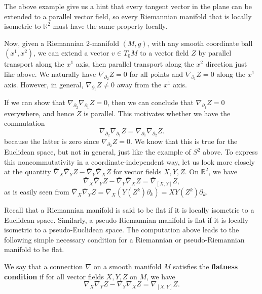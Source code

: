 \documentclass[../main.tex]{subfiles}
\begin{document}
The above example give us a hint that every tangent vector in the plane can be extended to a parallel vector field, so every Riemannian manifold that is locally isometric to $\mathbb{R}^2$ must have the same property locally.

Now, given a Riemannian 2-manifold $(M, g)$, with any smooth coordinate ball $(x^1, x^2)$, we can extend a vector $v \in T_0 M$ to a vector field $Z$ by parallel transport along the $x^1$ axis, then parallel transport along the $x^2$ direction just like above. We naturally have $\nabla_{\partial_2} Z = 0$ for all points and $\nabla_{\partial_1} Z = 0$ along the $x^1$ axis. However, in general, $\nabla_{\partial_1} Z \neq 0$ away from the $x^1$ axis.

If we can show that $\nabla_{\partial_2} \nabla_{\partial_1} Z = 0$, then we can conclude that $\nabla_{\partial_1} Z = 0$ everywhere, and hence $Z$ is parallel. This motivates whether we have the commutation
\begin{equation*}
	\nabla_{\partial_2} \nabla_{\partial_1} Z = \nabla_{\partial_1} \nabla_{\partial_2} Z.
\end{equation*}
because the latter is zero since $\nabla_{\partial_2} Z = 0$. We know that this is true for the Euclidean space, but not in general, just like the example of $S^2$ above. To express this noncommutativity in a coordinate-independent way, let us look more closely at the quantity $\bar{\nabla}_X \bar{\nabla}_Y Z - \bar{\nabla}_Y \bar{\nabla}_X Z$ for vector fields $X, Y, Z$. On $\mathbb{R}^2$, we have
\begin{equation}
	\bar{\nabla}_X \bar{\nabla}_Y Z - \bar{\nabla}_Y \bar{\nabla}_X Z = \bar{\nabla}_{[X, Y]} Z,
\end{equation}
as is easily seen from $\bar{\nabla}_X \bar{\nabla}_Y Z = \bar{\nabla}_X (Y(Z^k) \partial_k) = XY(Z^k) \partial_k$.

Recall that a Riemannian manifold is said to be flat if it is locally isometric to a Euclidean space. Similarly, a pseudo-Riemannian manifold is flat if it is locally isometric to a pseudo-Euclidean space. The computation above leads to the following simple necessary condition for a Riemannian or pseudo-Riemannian manifold to be flat.

We say that a connection $\nabla$ on a smooth manifold $M$ satisfies the \textbf{flatness condition} if for all vector fields $X, Y, Z$ on $M$, we have
\begin{equation}
	\nabla_X \nabla_Y Z - \nabla_Y \nabla_X Z = \nabla_{[X, Y]} Z.
\end{equation}
\end{document}
